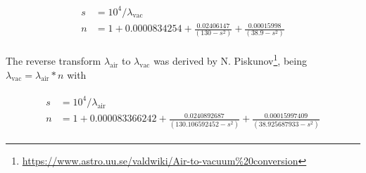 \begin{eqnarray}\label{eq:air2vac}
\left.\begin{aligned}
    s &=10^4 / \lambda_{\textrm{vac}}\\
    n &= 1+0.0000834254 + \frac{0.02406147}{(130 - s^2)} + \frac{0.00015998}{(38.9 - s^2)}
\end{aligned}\right.
\end{eqnarray}

The reverse transform $\lambda_\textrm{air}$ to $\lambda_\textrm{vac}$ was derived by N. Piskunov\footnote{\url{https://www.astro.uu.se/valdwiki/Air-to-vacuum\%20conversion}}, being $\lambda_\textrm{vac}=\lambda_\textrm{air}*n$ with 

\begin{eqnarray}\label{eq:vac2air}
\left.\begin{aligned}
    s&=10^4 / \lambda_{\textrm{air}}\\
    n&=1 + 0.000083366242 + \frac{0.0240892687}{(130.106592452 - s^2)} + \frac{0.00015997409}{(38.925687933 - s^2)}
\end{aligned}\right.
\end{eqnarray}


